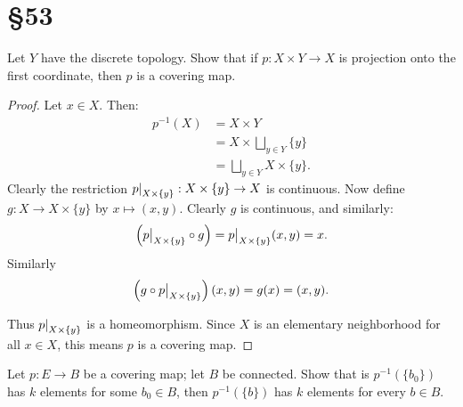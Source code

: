 \documentclass[10pt,oneside,openany]{memoir}
\begin{document}
\section*{\S 53}
\begin{exercise}[manual-num={1}]
Let $Y$ have the discrete topology. Show that if $p:X \times Y \rightarrow X$ is projection onto the first coordinate, then $p$ is a covering map.
\end{exercise}
	\begin{proof}
		Let $x \in X$.  Then:
		\begin{align*}
			p^{-1}(X)
			&= X \times Y \\
			&= X \times \bigsqcup_{y \in Y} \{y\}  \\
			&=\bigsqcup_{y \in Y} X \times \{y\}.
		\end{align*}
		Clearly the restriction $\restr{p}{X \times \{y\} }:X \times \{y\} \rightarrow X$ is continuous. Now define $g:X \rightarrow X \times \{y\} $ by $x \mapsto (x,y)$. Clearly $g$ is continuous, and similarly:
		\[
		\left(\restr{p}{X \times \{y\}}\circ g \right) = \restr{p}{X \times \{y\} }(x,y) = x.
		\] 
		Similarly
		\[
		 \left( g \circ \restr{p}{X \times \{y\}} \right)(x,y) = g(x) = (x,y).	
		\]

		Thus $\restr{p}{X \times \{y\} }$ is a homeomorphism. Since $X$ is an elementary neighborhood for all $x \in X$, this means  $p$ is a covering map.	 

	\end{proof}
\begin{exercise}[manual-num={3}]{{\color{red}}}
	Let $p:E \rightarrow B$ be a covering map; let $B$ be connected. Show that is $p^{-1}(\{b_0\})$ has $k$ elements for some $b_0 \in B$, then $p^{-1}(\{b\})$ has $k$ elements for every $b \in B$.
\end{exercise}
\end{document}

